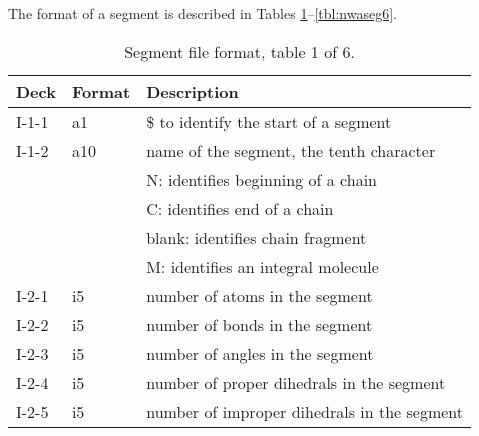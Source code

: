The format of a segment is
described in Tables \ref{tbl:nwaseg1}--\ref{tbl:nwaseg6}.

\begin{table}[htbp]
\begin{center}
\begin{tabular*}{150mm}{p{15mm}p{12mm}l}
\hline\hline
Deck  & Format & Description \\ \hline
I-1-1 & a1     & \$ to identify the start of a segment \\ %
I-1-2 & a10    & name of the segment, the tenth character\\
      &        & N: identifies beginning of a chain\\
      &        & C: identifies end of a chain\\
      &        & blank: identifies chain fragment\\
      &        & M: identifies an integral molecule\\
I-2-1 & i5     & number of atoms in the segment\\
I-2-2 & i5     & number of bonds in the segment\\
I-2-3 & i5     & number of angles in the segment\\
I-2-4 & i5     & number of proper dihedrals in the segment\\
I-2-5 & i5     & number of improper dihedrals in the segment\\
\hline
\end{tabular*}
\caption{Segment file format, table 1 of 6.\label{tbl:nwaseg1}}
\end{center}
\end{table}

